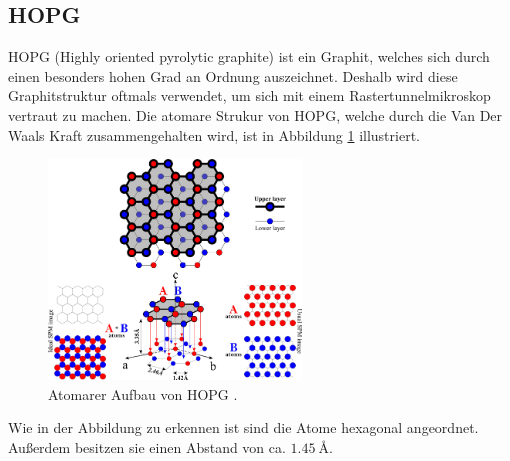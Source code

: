 \subsection{HOPG}
HOPG (Highly oriented pyrolytic graphite) ist ein Graphit, welches sich durch einen besonders hohen Grad
an Ordnung auszeichnet. Deshalb wird diese Graphitstruktur oftmals verwendet, um sich mit einem Rastertunnelmikroskop vertraut zu machen.
Die atomare Strukur von HOPG, welche durch die Van Der Waals Kraft zusammengehalten wird,
ist in Abbildung \ref{fig: hopg} illustriert.
\begin{figure}[!h]
  \centering
  \includegraphics[width=0.6\textwidth]{./pics/hopg.jpg}
  \caption{Atomarer Aufbau von HOPG \cite{hopg}.}
  \label{fig: hopg}
\end{figure}
Wie in der Abbildung zu erkennen ist sind die Atome hexagonal angeordnet. Außerdem besitzen sie einen Abstand von ca.
$\SI{1.45}{\angstrom}$.
